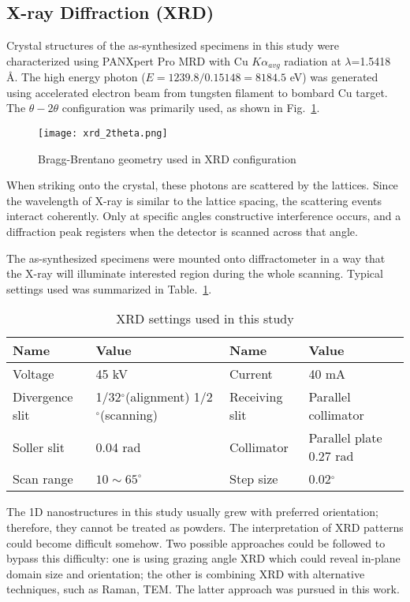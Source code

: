 \subsection{X-ray Diffraction (XRD)}
Crystal structures of the as-synthesized specimens in this study were characterized using PANXpert Pro MRD with Cu $K\alpha_{avg}$ radiation at $\lambda$=1.5418 \si{\angstrom}. The high energy photon ($E = 1239.8/0.15148= 8184.5$ eV) was generated using accelerated electron beam from tungsten filament to bombard Cu target. The $\theta-2\theta$ configuration was primarily used, as shown in Fig.~\ref{fig:ch2theta}. 
\begin{figure}[htb]
\centering
\texttt{[image: xrd\_2theta.png]}
\caption{Bragg-Brentano geometry used in XRD configuration}
\label{fig:ch2theta}
\end{figure}
When striking onto the crystal, these photons are scattered by the lattices. Since the wavelength of X-ray is similar to the lattice spacing, the scattering events interact coherently. Only at specific angles constructive interference occurs, and a diffraction peak registers when the detector is scanned across that angle.  

The as-synthesized specimens were mounted onto diffractometer in a way that the X-ray will illuminate interested region during the whole scanning. Typical settings used was summarized in Table.~\ref{tab:ch2xrd}.

\begin{table}[htb]
\centering
\caption{XRD settings used in this study}\label{tab:ch2xrd}
\begin{tabular}{lp{1.5in}lp{1.5in}}
\toprule
Name & Value & Name & Value  \\
\midrule
Voltage   & 45 kV & Current & 40 mA \\
Divergence slit & 1/32$^\circ$(alignment) 1/2$^\circ$(scanning) & Receiving slit& Parallel collimator \\
Soller slit & 0.04 rad & Collimator & Parallel plate 0.27 rad \\
Scan range & $10 \sim 65 ^\circ$ & Step size & 0.02$^\circ$ \\
\bottomrule
\end{tabular}
\end{table}

The 1D nanostructures in this study usually grew with preferred orientation; therefore, they cannot be treated as powders. The interpretation of XRD patterns could become difficult somehow. Two possible approaches could be followed to bypass this difficulty: one is using grazing angle XRD which could reveal in-plane domain size and orientation;\cite{Tersigni2011,Goorsky2002} the other is combining XRD with alternative techniques, such as Raman, TEM. The latter approach was pursued in this work. 


